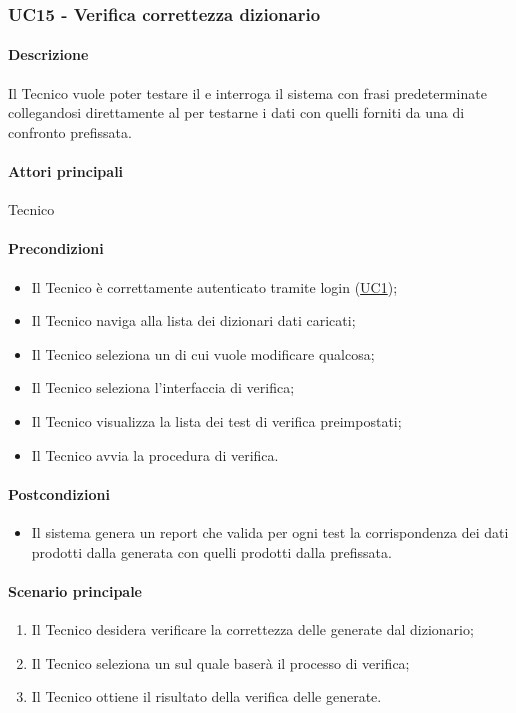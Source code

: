 \subsubsection{UC15 - Verifica correttezza dizionario}\label{UC15}
\paragraph*{Descrizione}
Il Tecnico vuole poter testare il  e interroga il sistema con frasi predeterminate collegandosi direttamente al  per testarne i dati con quelli forniti da una  di confronto prefissata.

\paragraph*{Attori principali}
Tecnico

\paragraph*{Precondizioni}
\begin{itemize}
  \item Il Tecnico è correttamente autenticato tramite login (\hyperref[UC1]{UC1});
  \item Il Tecnico naviga alla lista dei dizionari dati caricati;
  \item Il Tecnico seleziona un  di cui vuole modificare qualcosa;
  \item Il Tecnico seleziona l’interfaccia di verifica;
  \item Il Tecnico visualizza la lista dei test di verifica preimpostati;
  \item Il Tecnico avvia la procedura di verifica.
\end{itemize}

\paragraph*{Postcondizioni}
\begin{itemize}
  \item Il sistema genera un report che valida per ogni test la corrispondenza dei dati prodotti dalla  generata con quelli prodotti dalla  prefissata.
\end{itemize}

\paragraph*{Scenario principale}
\begin{enumerate}
  \item Il Tecnico desidera verificare la correttezza delle  generate dal dizionario;
  \item Il Tecnico seleziona un  sul quale baserà il processo di verifica;
  \item Il Tecnico ottiene il risultato della verifica delle  generate.
\end{enumerate}

